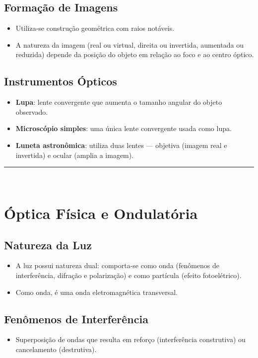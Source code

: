 \documentclass[a4paper,12pt]{article}
\begin{document}
\begin{multicols}{2}
\subsection{Formação de Imagens}
\begin{itemize}
    \item Utiliza-se construção geométrica com raios notáveis.
    \item A natureza da imagem (real ou virtual, direita ou invertida, aumentada ou reduzida) depende da posição do objeto em relação ao foco e ao centro óptico.
\end{itemize}

\subsection{Instrumentos Ópticos}
\begin{itemize}
    \item \textbf{Lupa}: lente convergente que aumenta o tamanho angular do objeto observado.
    \item \textbf{Microscópio simples}: uma única lente convergente usada como lupa.
    \item \textbf{Luneta astronômica}: utiliza duas lentes — objetiva (imagem real e invertida) e ocular (amplia a imagem).
\end{itemize}

\noindent\rule{\linewidth}{1pt}\\

\section{Óptica Física e Ondulatória}

\subsection{Natureza da Luz}
\begin{itemize}
    \item A luz possui natureza dual: comporta-se como onda (fenômenos de interferência, difração e polarização) e como partícula (efeito fotoelétrico).
    \item Como onda, é uma onda eletromagnética transversal.
\end{itemize}

\subsection{Fenômenos de Interferência}
\begin{itemize}
    \item Superposição de ondas que resulta em reforço (interferência construtiva) ou cancelamento (destrutiva).
\end{itemize}


\end{multicols}
\end{document}
